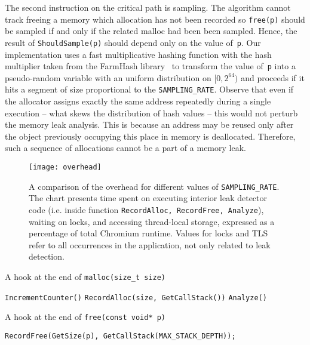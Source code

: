 \documentclass[preprint, numbers]{sigplanconf}
\begin{document}
The second instruction on the critical path is sampling.
The algorithm cannot track freeing a memory which allocation has not been recorded
so \texttt{free(p)} should be sampled if and only if the related malloc had been been sampled.
Hence, the result of \texttt{ShouldSample(p)} should depend only on the value of~\texttt{p}.
Our implementation uses a fast multiplicative hashing function with the hash multiplier taken from the FarmHash library~\cite{farmhash}
to transform the value of~\texttt{p} into a pseudo-random variable with an uniform
distribution on $[0, 2^{64})$ and proceeds if it hits a segment of size proportional
to the \texttt{SAMPLING\_RATE}.
Observe that even if the allocator assigns exactly the same address repeatedly during a single execution --
what skews the distribution of hash values -- this would not perturb the memory leak analysis.
This is because an address may be reused only after the object previously occupying
this place in memory is deallocated.
Therefore, such a sequence of allocations cannot be a part of a memory leak.

\begin{figure}
\centering
\texttt{[image: overhead]}
	\caption{A comparison of the overhead for different values of \texttt{SAMPLING\_RATE}.
	The chart presents time spent on executing interior leak detector code (i.e. inside
	function \texttt{RecordAlloc, RecordFree, Analyze}), waiting on locks, and accessing
	thread-local storage, expressed as a percentage of total Chromium runtime.
	Values for locks and TLS refer to all occurrences in the application, not only related to leak detection.
	}
\label{fig:overhead}
\end{figure}

\begin{algorithm}
	\caption{A hook at the end of \texttt{malloc(size\_t size)}}
\begin{algorithmic}[1]
	\State \texttt{IncrementCounter()}
		\Return
	\EndIf
	\State \texttt{RecordAlloc(size, GetCallStack())}
		\State \texttt{Analyze()}
	\EndIf
\EndFunction
\end{algorithmic}
\label{alg:alloc-hook}
\end{algorithm}

\begin{algorithm}
	\caption{A hook at the end of \texttt{free(const void* p)}}
\begin{algorithmic}[1]
		\Return
	\EndIf
	\State \texttt{RecordFree(GetSize(p), GetCallStack(MAX\_STACK\_DEPTH));}
\EndFunction
\end{algorithmic}
\label{alg:free-hook}
\end{algorithm}
\end{document}
